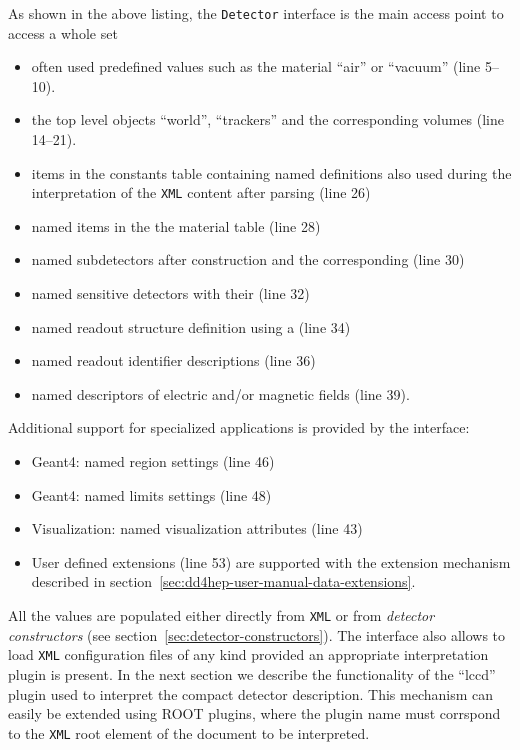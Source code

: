 As shown in the above listing, the \texttt{Detector} interface is the main access point to access a whole set 
\begin{itemize}
\item often used predefined values such as the material ``air'' or ``vacuum'' (line 5--10).
\item the top level objects ``world'', ``trackers'' and the corresponding volumes (line 14--21).
\item items in the constants table containing named definitions also used during the interpretation of the \texttt{XML} content after parsing (line 26)
\item named items in the the material table (line 28)
\item named subdetectors after construction and the corresponding (line 30)
\item named sensitive detectors with their (line 32)
\item named readout structure definition using a (line 34)
\item named readout identifier descriptions (line 36)
\item named descriptors of electric and/or magnetic fields  (line 39).
\end{itemize}
Additional support for specialized applications is provided by the interface:
\begin{itemize}
\item Geant4: named region settings  (line 46)
\item Geant4: named limits settings  (line 48)
\item Visualization: named visualization attributes  (line 43)
\item User defined extensions (line 53) are supported with the extension mechanism described in section~\ref{sec:dd4hep-user-manual-data-extensions}.
\end{itemize}

All the values are populated either directly from \texttt{XML} or from \textit{detector constructors} (see section~\ref{sec:detector-constructors}). The interface also allows to load \texttt{XML} configuration files of any kind provided an appropriate  interpretation plugin is present. In the next section we describe the functionality  of the ``lccd'' plugin used to interpret the compact detector description. This mechanism can easily be extended using ROOT plugins, where the plugin name must corrspond to the \texttt{XML} root element of the document to be interpreted.

